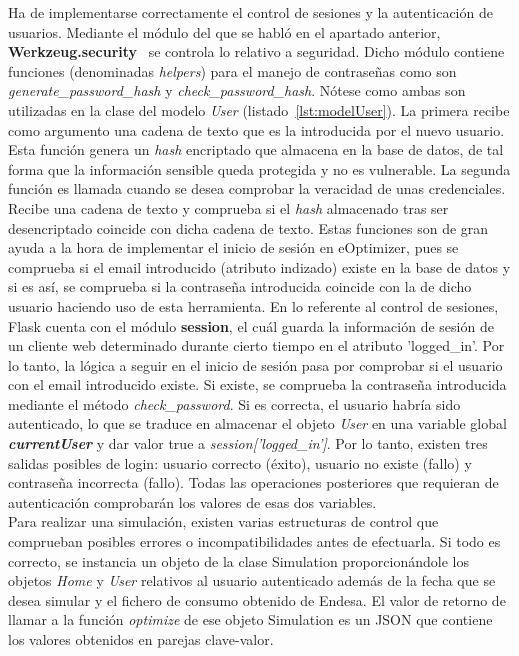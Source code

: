 Ha de implementarse correctamente el control de sesiones y la autenticación de usuarios. Mediante el módulo del que se habló en el apartado anterior, \textbf{Werkzeug.security}~\cite{Werk} se controla lo relativo a seguridad. Dicho módulo contiene funciones (denominadas \textit{helpers}) para el manejo de contraseñas como son \textit{generate\_password\_hash} y \textit{check\_password\_hash}. Nótese como ambas son utilizadas en la clase del modelo \textit{User} (listado~\ref{lst:modelUser}). La primera recibe como argumento una cadena de texto que es la introducida por el nuevo usuario. Esta función genera un \textit{hash} encriptado que almacena en la base de datos, de tal forma que la información sensible queda protegida y no es vulnerable. La segunda función es llamada cuando se desea comprobar la veracidad de unas credenciales. Recibe una cadena de texto y comprueba si el \textit{hash} almacenado tras ser desencriptado coincide con dicha cadena de texto. Estas funciones son de gran ayuda a la hora de implementar el inicio de sesión en eOptimizer, pues se comprueba si el email introducido (atributo indizado) existe en la base de datos y si es así, se comprueba si la contraseña introducida coincide con la de dicho usuario haciendo uso de esta herramienta. En lo referente al control de sesiones, Flask cuenta con el módulo \textbf{session}, el cuál guarda la información de sesión de un cliente web determinado durante cierto tiempo en el atributo 'logged\_in'. Por lo tanto, la lógica a seguir en el inicio de sesión pasa por comprobar si el usuario con el email introducido existe. Si existe, se comprueba la contraseña introducida mediante el método \textit{check\_password}. Si es correcta, el usuario habría sido autenticado, lo que se traduce en almacenar el objeto \textit{User} en una variable global \textbf{\textit{currentUser}} y dar valor true a \textit{session['logged\_in']}. Por lo tanto, existen tres salidas posibles de login: usuario correcto (éxito), usuario no existe (fallo) y contraseña incorrecta (fallo). Todas las operaciones posteriores que requieran de autenticación comprobarán los valores de esas dos variables.\\

Para realizar una simulación, existen varias estructuras de control que comprueban posibles errores o incompatibilidades antes de efectuarla. Si todo es correcto, se instancia un objeto de la clase Simulation proporcionándole los objetos \textit{Home} y \textit{User} relativos al usuario autenticado además de la fecha que se desea simular y el fichero de consumo obtenido de Endesa. El valor de retorno de llamar a la función \textit{optimize} de ese objeto Simulation es un \gls{JSON} que contiene los valores obtenidos en parejas clave-valor.\\

